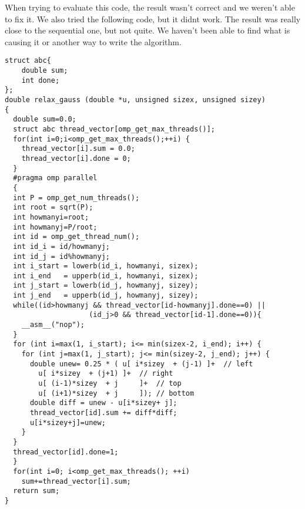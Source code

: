 \justify
When trying to evaluate this code, the result wasn't correct and we weren't able to fix it. We also tried the following code, but it didnt work. The result was really close to the sequential one, but not quite. We haven't been able to find what is causing it or another way to write the algorithm.

\begin{lstlisting}
struct abc{
	double sum;
	int done;
};
double relax_gauss (double *u, unsigned sizex, unsigned sizey)
{
  double sum=0.0;
  struct abc thread_vector[omp_get_max_threads()];
  for(int i=0;i<omp_get_max_threads();++i) {
    thread_vector[i].sum = 0.0;
    thread_vector[i].done = 0;
  }	
  #pragma omp parallel
  {
  int P = omp_get_num_threads();
  int root = sqrt(P);
  int howmanyi=root;
  int howmanyj=P/root; 
  int id = omp_get_thread_num();
  int id_i = id/howmanyj;
  int id_j = id%howmanyj;
  int i_start = lowerb(id_i, howmanyi, sizex);
  int i_end   = upperb(id_i, howmanyi, sizex);
  int j_start = lowerb(id_j, howmanyj, sizey);
  int j_end   = upperb(id_j, howmanyj, sizey);
  while((id>howmanyj && thread_vector[id-howmanyj].done==0) || 
                    (id_j>0 && thread_vector[id-1].done==0)){
    __asm__("nop");
  }
  for (int i=max(1, i_start); i<= min(sizex-2, i_end); i++) {
    for (int j=max(1, j_start); j<= min(sizey-2, j_end); j++) {
      double unew= 0.25 * ( u[ i*sizey	+ (j-1) ]+  // left
		u[ i*sizey	+ (j+1) ]+  // right
		u[ (i-1)*sizey	+ j     ]+  // top
		u[ (i+1)*sizey	+ j     ]); // bottom
      double diff = unew - u[i*sizey+ j];
      thread_vector[id].sum += diff*diff;
      u[i*sizey+j]=unew;
    } 
  }
  thread_vector[id].done=1;
  }
  for(int i=0; i<omp_get_max_threads(); ++i) 
    sum+=thread_vector[i].sum;
  return sum;
}
\end{lstlisting}